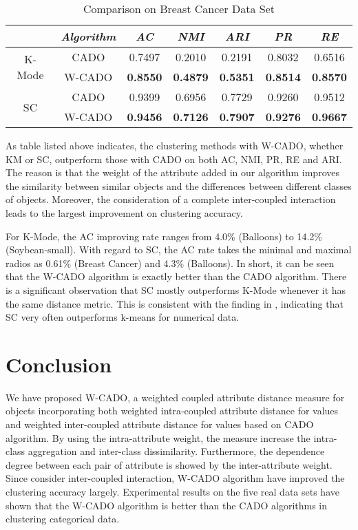 \documentclass[review]{elsarticle}
\begin{document}
\begin{table}[!h]\tabcolsep=0.065in
\centering
\caption{Comparison on Breast Cancer Data Set}
\small
\label{tab:Comparison on Breast Cancer Data Set}
\begin{tabular}{c|c|c|c|c|c|c}
\hline
\emph{}&\emph{Algorithm}&\emph{AC}&\emph{NMI}&\emph{ARI}&\emph{PR}&\emph{RE} \\
\hline
\multirow{2}{*}{K-Mode} & CADO & 0.7497 & 0.2010 & 0.2191 & 0.8032 & 0.6516\\
    \cline{2-7}
    & W-CADO & \textbf{0.8550} & \textbf{0.4879} & \textbf{0.5351} & \textbf{0.8514} & \textbf{0.8570}\\
    \hline
\multirow{2}{*}{SC} & CADO & 0.9399 & 0.6956 & 0.7729 & 0.9260 & 0.9512\\
    \cline{2-7}
    & W-CADO & \textbf{0.9456} & \textbf{0.7126} & \textbf{0.7907} & \textbf{0.9276} & \textbf{0.9667}\\
\hline
\end{tabular}
\end{table}


 As table listed above indicates, the clustering methods with W-CADO, whether KM or SC, outperform those with CADO on both AC, NMI, PR, RE and ARI. The reason is that the weight of the attribute added in our algorithm improves the similarity between similar objects and the differences between different classes of objects. Moreover, the consideration of a complete inter-coupled interaction leads to the largest improvement on clustering accuracy.

 For K-Mode, the AC improving rate ranges from 4.0\% (Balloons) to 14.2\% (Soybean-small). With regard to SC, the AC rate takes the minimal and maximal radios as 0.61\% (Breast Cancer) and 4.3\% (Balloons). In short, it can be seen that the W-CADO algorithm is exactly better than the CADO algorithm. There is a significant observation that SC mostly outperforms K-Mode whenever it has the same distance metric. This is consistent with the finding in \cite{UVon2007Tutorial}, indicating that SC very often outperforms k-means for numerical data.

\section{Conclusion}
We have proposed W-CADO, a weighted coupled attribute distance measure for objects incorporating both weighted intra-coupled attribute distance for values and weighted inter-coupled attribute distance for values based on CADO algorithm. By using the intra-attribute weight, the measure increase the intra-class aggregation and inter-class dissimilarity. Furthermore, the dependence degree between each pair of attribute is showed by the inter-attribute weight. Since consider inter-coupled interaction, W-CADO algorithm have improved the clustering accuracy largely. Experimental results on the five real data sets have shown that the W-CADO algorithm is better than the CADO algorithms in clustering categorical data.
\end{document}
